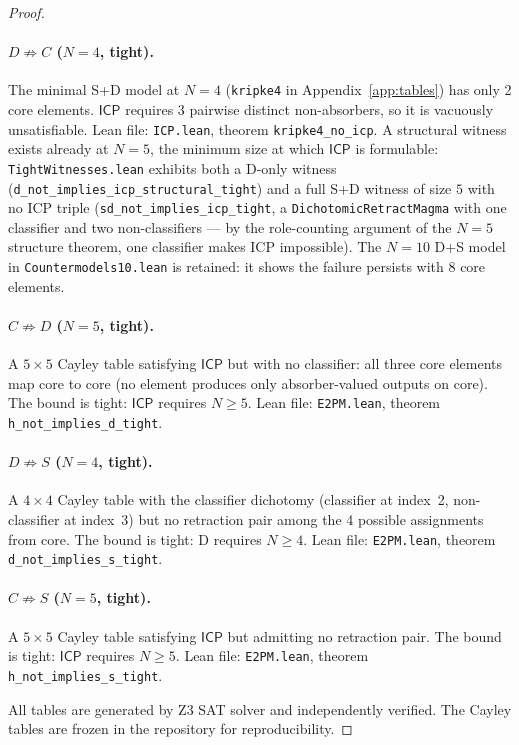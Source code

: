 \documentclass[sigconf,screen]{acmart}
\newcommand{\ICP}{\textsf{ICP}}
\theoremstyle{remark}
\begin{document}
\begin{proof}
\paragraph{$D \not\Rightarrow C$ ($N\!=\!4$, tight).}
The minimal S+D model at $N\!=\!4$ (\texttt{kripke4} in Appendix~\ref{app:tables}) has only 2 core elements. $\ICP$ requires 3 pairwise distinct non-absorbers, so it is vacuously unsatisfiable. Lean file: \texttt{ICP.lean}, theorem \texttt{kripke4\_no\_icp}. A structural witness exists already at $N\!=\!5$, the minimum size at which $\ICP$ is formulable: \texttt{TightWitnesses.lean} exhibits both a D-only witness (\texttt{d\_not\_implies\_icp\_structural\_tight}) and a full S+D witness of size $5$ with no ICP triple (\texttt{sd\_not\_implies\_icp\_tight}, a \texttt{DichotomicRetractMagma} with one classifier and two non-classifiers --- by the role-counting argument of the $N\!=\!5$ structure theorem, one classifier makes ICP impossible). The $N\!=\!10$ D+S model in \texttt{Countermodels10.lean} is retained: it shows the failure persists with 8 core elements.

\paragraph{$C \not\Rightarrow D$ ($N\!=\!5$, tight).}
A $5 \times 5$ Cayley table satisfying $\ICP$ but with no classifier: all three core elements map core to core (no element produces only absorber-valued outputs on core). The bound is tight: $\ICP$ requires $N \geq 5$. Lean file: \texttt{E2PM.lean}, theorem \texttt{h\_not\_implies\_d\_tight}.

\paragraph{$D \not\Rightarrow S$ ($N\!=\!4$, tight).}
A $4 \times 4$ Cayley table with the classifier dichotomy (classifier at index~2, non-classifier at index~3) but no retraction pair among the 4 possible assignments from core. The bound is tight: D requires $N \geq 4$. Lean file: \texttt{E2PM.lean}, theorem \texttt{d\_not\_implies\_s\_tight}.

\paragraph{$C \not\Rightarrow S$ ($N\!=\!5$, tight).}
A $5 \times 5$ Cayley table satisfying $\ICP$ but admitting no retraction pair. The bound is tight: $\ICP$ requires $N \geq 5$. Lean file: \texttt{E2PM.lean}, theorem \texttt{h\_not\_implies\_s\_tight}.

All tables are generated by Z3 SAT solver and independently verified. The Cayley tables are frozen in the repository for reproducibility.
\end{proof}
\end{document}
